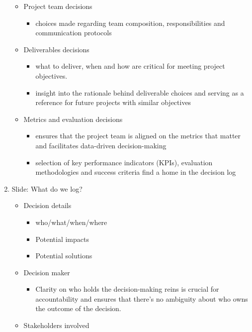\documentclass{article}
\begin{document}
\begin{enumerate}
\begin{itemize}
\begin{itemize}
        \end{itemize}
        \item Project team decisions
        \begin{itemize}
            \item choices made regarding team composition, responsibilities and communication protocols
        \end{itemize}
        \item Deliverables decisions
        \begin{itemize}
            \item  what to deliver, when and how are critical for meeting project objectives.
            \item insight into the rationale behind deliverable choices and serving as a reference for future projects with similar objectives
        \end{itemize}
        \item Metrics and evaluation decisions
        \begin{itemize}
            \item ensures that the project team is aligned on the metrics that matter and facilitates data-driven decision-making
            \item selection of key performance indicators (KPIs), evaluation methodologies and success criteria find a home in the decision log
        \end{itemize}
    \end{itemize}
    \item Slide: What do we log?
    \begin{itemize}
        \item Decision details
        \begin{itemize}
            \item who/what/when/where
            \item Potential impacts
            \item Potential solutions
        \end{itemize}
        \item Decision maker
        \begin{itemize}
            \item Clarity on who holds the decision-making reins is crucial for accountability and ensures that there's no ambiguity about who owns the outcome of the decision.
        \end{itemize}
        \item Stakeholders involved

\end{itemize}
\end{enumerate}
\end{document}
